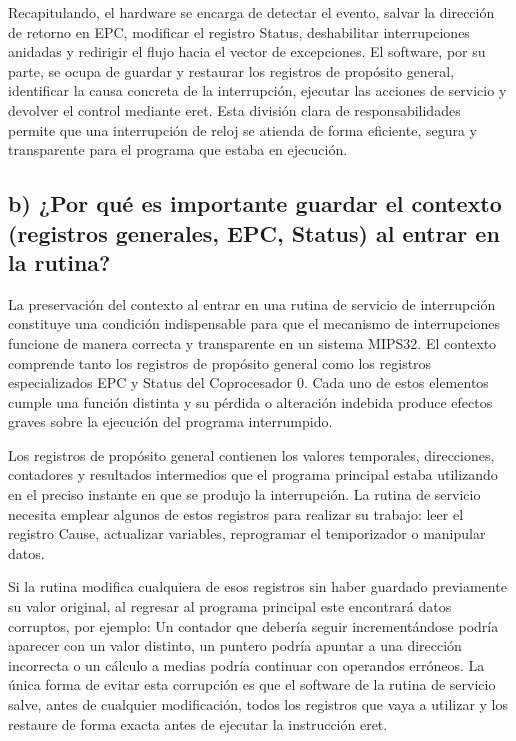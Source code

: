 \documentclass[12pt, letterpaper]{article}
\begin{document}
Recapitulando, el hardware se encarga de detectar el evento, salvar la dirección de retorno en EPC, modificar el registro Status, deshabilitar interrupciones anidadas y redirigir el flujo hacia el vector de excepciones. El software, por su parte, se ocupa de guardar y restaurar los registros de propósito general, identificar la causa concreta de la interrupción, ejecutar las acciones de servicio y devolver el control mediante eret. Esta división clara de responsabilidades permite que una interrupción de reloj se atienda de forma eficiente, segura y transparente para el programa que estaba en ejecución.

\subsection*{b) ¿Por qué es importante guardar el contexto (registros generales, EPC, Status) al entrar en la rutina?}

La preservación del contexto al entrar en una rutina de servicio de interrupción constituye una condición indispensable para que el mecanismo de interrupciones funcione de manera correcta y transparente en un sistema MIPS32. El contexto comprende tanto los registros de propósito general como los registros especializados EPC y Status del Coprocesador 0. Cada uno de estos elementos cumple una función distinta y su pérdida o alteración indebida produce efectos graves sobre la ejecución del programa interrumpido.

Los registros de propósito general contienen los valores temporales, direcciones, contadores y resultados intermedios que el programa principal estaba utilizando en el preciso instante en que se produjo la interrupción. La rutina de servicio necesita emplear algunos de estos registros para realizar su trabajo: leer el registro Cause, actualizar variables, reprogramar el temporizador o manipular datos.

Si la rutina modifica cualquiera de esos registros sin haber guardado previamente su valor original, al regresar al programa principal este encontrará datos corruptos, por ejemplo: Un contador que debería seguir incrementándose podría aparecer con un valor distinto, un puntero podría apuntar a una dirección incorrecta o un cálculo a medias podría continuar con operandos erróneos. La única forma de evitar esta corrupción es que el software de la rutina de servicio salve, antes de cualquier modificación, todos los registros que vaya a utilizar y los restaure de forma exacta antes de ejecutar la instrucción eret.
\end{document}
